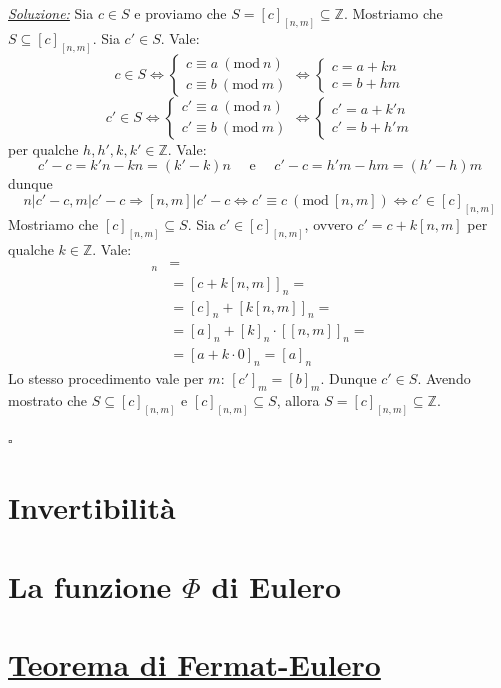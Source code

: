 \documentclass[oneside]{book}
\theoremstyle{remark}
\newcommand{\cvd}{\begin{flushright}$\square$\end{flushright}} %
\newcommand{\Mod}[1]{\ (\mathrm{mod}\ #1)} %
\begin{document}
\begin{tcolorbox}[enhanced, breakable, title={Teolema cinese del lesto}]
\underline{\emph{Soluzione:}} Sia $c \in S$ e proviamo che $S=[c]_{[n,m]} \subseteq \mathbb{Z}$.
Mostriamo che $S \subseteq [c]_{[n,m]}$. Sia $c'\in S$. Vale:
\[ c \in S \Longleftrightarrow
    \begin{cases}
        c \equiv a \Mod{n}\\
        c \equiv b \Mod{m}
    \end{cases}
    \Longleftrightarrow
    \begin{cases}
        c = a+kn\\
        c = b+hm
    \end{cases}
\]
\[
    c' \in S \Longleftrightarrow
    \begin{cases}
        c' \equiv a \Mod{n}\\
        c' \equiv b \Mod{m}
    \end{cases}
    \Longleftrightarrow
    \begin{cases}
        c' = a+k'n\\
        c' = b+h'm
    \end{cases}
\]
per qualche $h,h',k,k' \in \mathbb{Z}$. Vale:
\[ c'-c=k'n-kn=(k'-k)n \quad\text{ e }\quad c'-c=h'm-hm=(h'-h)m \]
dunque
\[ n|c'-c,m|c'-c \Longrightarrow [n,m]|c'-c \Longleftrightarrow c'\equiv c \Mod{[n,m]} \Longleftrightarrow c' \in [c]_{[n,m]} \]
Mostriamo che $[c]_{[n,m]} \subseteq S$. Sia $c' \in [c]_{[n,m]}$, ovvero $c'=c+k[n,m]$ per qualche
$k \in \mathbb{Z}$. Vale:
\begin{align*}
    [c']_n &=\\
    &= [c+k[n,m]]_n =\\
    &= [c]_n + [k[n,m]]_n =\\
    &= [a]_n + [k]_n \cdot [[n,m]]_n =\\
    &= [a+k\cdot 0]_n = [a]_n
\end{align*}
Lo stesso procedimento vale per $m$: $[c']_m = [b]_m$. Dunque $c'\in S$.
Avendo mostrato che $S\subseteq[c]_{[n,m]}$ e $[c]_{[n,m]}\subseteq S$,
allora $S = [c]_{[n,m]}\subseteq\mathbb{Z}$.
\cvd
\end{tcolorbox}

\section{Invertibilità}
\section{La funzione $\Phi$ di Eulero}
\section{\underline{Teorema di Fermat-Eulero}}
\end{document}
